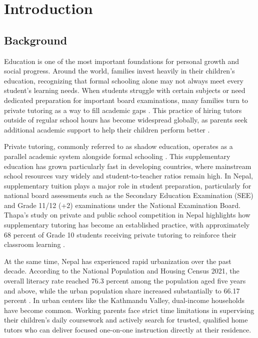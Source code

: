 \documentclass[12pt]{report}
\begin{document}
\newpage
\chapter{Introduction}
\setcounter{page}{1}

\section{Background}
Education is one of the most important foundations for personal growth and social progress. Around the world, families invest heavily in their children's education, recognizing that formal schooling alone may not always meet every student's learning needs. When students struggle with certain subjects or need dedicated preparation for important board examinations, many families turn to private tutoring as a way to fill academic gaps \cite{Bray2007Shadow}. This practice of hiring tutors outside of regular school hours has become widespread globally, as parents seek additional academic support to help their children perform better \cite{Bray2012Shadow}.

Private tutoring, commonly referred to as shadow education, operates as a parallel academic system alongside formal schooling \cite{Kim2019Shadow}. This supplementary education has grown particularly fast in developing countries, where mainstream school resources vary widely and student-to-teacher ratios remain high. In Nepal, supplementary tuition plays a major role in student preparation, particularly for national board assessments such as the Secondary Education Examination (SEE) and Grade 11/12 (+2) examinations under the National Examination Board. Thapa's study on private and public school competition in Nepal highlights how supplementary tutoring has become an established practice, with approximately 68 percent of Grade 10 students receiving private tutoring to reinforce their classroom learning \cite{Thapa2013Private}.

At the same time, Nepal has experienced rapid urbanization over the past decade. According to the National Population and Housing Census 2021, the overall literacy rate reached 76.3 percent among the population aged five years and above, while the urban population share increased substantially to 66.17 percent \cite{CBS2023}. In urban centers like the Kathmandu Valley, dual-income households have become common. Working parents face strict time limitations in supervising their children's daily coursework and actively search for trusted, qualified home tutors who can deliver focused one-on-one instruction directly at their residence.
\end{document}

